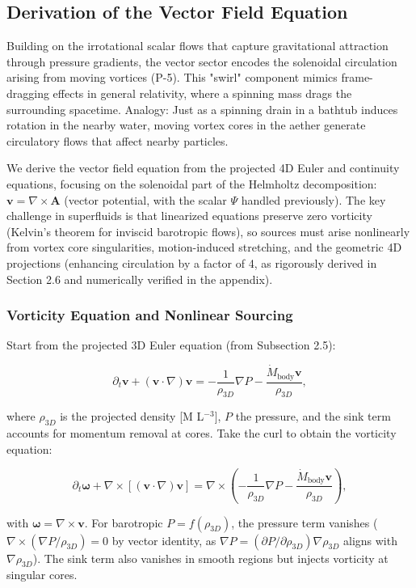 \documentclass{article}
\begin{document}
\subsection{Derivation of the Vector Field Equation}

Building on the irrotational scalar flows that capture gravitational attraction through pressure gradients, the vector sector encodes the solenoidal circulation arising from moving vortices (P-5). This "swirl" component mimics frame-dragging effects in general relativity, where a spinning mass drags the surrounding spacetime. Analogy: Just as a spinning drain in a bathtub induces rotation in the nearby water, moving vortex cores in the aether generate circulatory flows that affect nearby particles.

We derive the vector field equation from the projected 4D Euler and continuity equations, focusing on the solenoidal part of the Helmholtz decomposition: $\mathbf{v} = \nabla \times \mathbf{A}$ (vector potential, with the scalar $\Psi$ handled previously). The key challenge in superfluids is that linearized equations preserve zero vorticity (Kelvin's theorem for inviscid barotropic flows), so sources must arise nonlinearly from vortex core singularities, motion-induced stretching, and the geometric 4D projections (enhancing circulation by a factor of 4, as rigorously derived in Section 2.6 and numerically verified in the appendix).

\subsubsection{Vorticity Equation and Nonlinear Sourcing}

Start from the projected 3D Euler equation (from Subsection 2.5):

\[
\partial_t \mathbf{v} + (\mathbf{v} \cdot \nabla) \mathbf{v} = -\frac{1}{\rho_{3D}} \nabla P - \frac{\dot{M}_{\text{body}} \mathbf{v}}{\rho_{3D}},
\]

where $\rho_{3D}$ is the projected density [M L$^{-3}$], $P$ the pressure, and the sink term accounts for momentum removal at cores. Take the curl to obtain the vorticity equation:

\[
\partial_t \boldsymbol{\omega} + \nabla \times [(\mathbf{v} \cdot \nabla) \mathbf{v}] = \nabla \times \left( -\frac{1}{\rho_{3D}} \nabla P - \frac{\dot{M}_{\text{body}} \mathbf{v}}{\rho_{3D}} \right),
\]

with $\boldsymbol{\omega} = \nabla \times \mathbf{v}$. For barotropic $P = f(\rho_{3D})$, the pressure term vanishes ($\nabla \times (\nabla P / \rho_{3D}) = 0$ by vector identity, as $\nabla P = (\partial P / \partial \rho_{3D}) \nabla \rho_{3D}$ aligns with $\nabla \rho_{3D}$). The sink term also vanishes in smooth regions but injects vorticity at singular cores.
\end{document}
